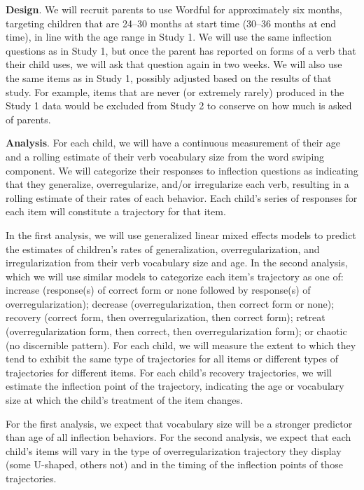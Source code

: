\documentclass[
   11pt,
       ]{book}
\begin{document}
\textbf{Design}.
We will recruit parents to use Wordful for approximately six months, targeting children that are 24--30 months at start time (30--36 months at end time), in line with the age range in Study 1.
We will use the same inflection questions as in Study 1, but once the parent has reported on forms of a verb that their child uses, we will ask that question again in two weeks.
We will also use the same items as in Study 1, possibly adjusted based on the results of that study. For example, items that are never (or extremely rarely) produced in the Study 1 data would be excluded from Study 2 to conserve on how much is asked of parents.

\textbf{Analysis}. For each child, we will have a continuous measurement of their age and a rolling estimate of their verb vocabulary size from the word swiping component. We will categorize their responses to inflection questions as indicating that they generalize, overregularize, and/or irregularize each verb, resulting in a rolling estimate of their rates of each behavior. Each child's series of responses for each item will constitute a trajectory for that item.

In the first analysis, we will use generalized linear mixed effects models to predict the estimates of children's rates of generalization, overregularization, and irregularization from their verb vocabulary size and age. In the second analysis, which we will use similar models to categorize each item's trajectory as one of: increase (response(s) of correct form or none followed by response(s) of overregularization); decrease (overregularization, then correct form or none); recovery (correct form, then overregularization, then correct form); retreat (overregularization form, then correct, then overregularization form); or chaotic (no discernible pattern). For each child, we will measure the extent to which they tend to exhibit the same type of trajectories for all items or different types of trajectories for different items. For each child's recovery trajectories, we will estimate the inflection point of the trajectory, indicating the age or vocabulary size at which the child's treatment of the item changes.

For the first analysis, we expect that vocabulary size will be a stronger predictor than age of all inflection behaviors. For the second analysis, we expect that each child's items will vary in the type of overregularization trajectory they display (some U-shaped, others not) and in the timing of the inflection points of those trajectories.
\end{document}
